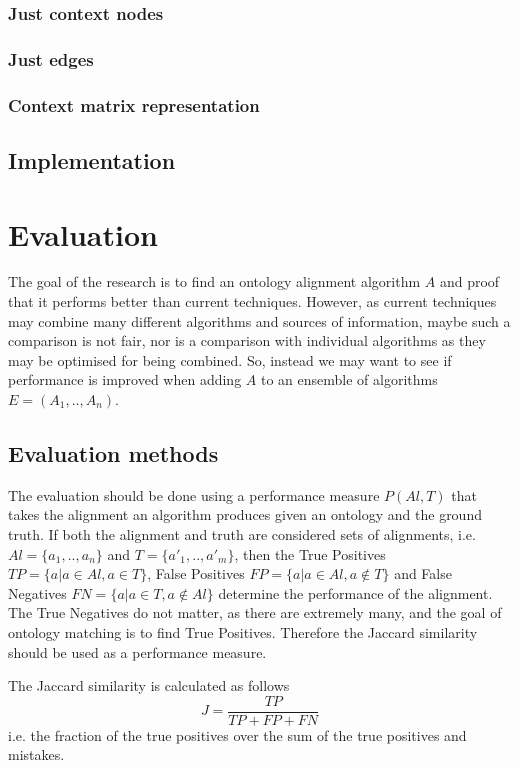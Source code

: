 \documentclass{article}
\begin{document}
  \subsubsection{Just context nodes}
  
  \subsubsection{Just edges}
  
  \subsubsection{Context matrix representation}
  
 \subsection{Implementation}
 
 
 \section{Evaluation}
 The goal of the research is to find an ontology alignment algorithm $A$ and proof that it performs better than current techniques. However, as current techniques may combine many different algorithms and sources of information, maybe such a comparison is not fair, nor is a comparison with individual algorithms as they may be optimised for being combined. So, instead we may want to see if performance is improved when adding $A$ to an ensemble of algorithms $E=(A_1,..,A_n)$.
 \subsection{Evaluation methods} \label{Evaluation methods}
 The evaluation should be done using a performance measure $P(Al,T)$ that takes the alignment an algorithm produces given an ontology and the ground truth. If both the alignment and truth are considered sets of alignments, i.e. $Al=\{a_1,..,a_n\}$ and $T=\{a'_1,..,a'_m\}$, then the True Positives $TP=\{a|a\in Al, a\in T\}$, False Positives $FP=\{a|a\in Al, a\notin T\}$ and False Negatives $FN=\{a|a\in T, a\notin Al\}$ determine the performance of the alignment. The True Negatives do not matter, as there are extremely many, and the goal of ontology matching is to find True Positives. Therefore the Jaccard similarity should be used as a performance measure.
 
 The Jaccard similarity is calculated as follows
 \[
 J = \frac{TP}{TP + FP + FN}
 \]
 i.e. the fraction of the true positives over the sum of the true positives and mistakes.
 
\end{document}
